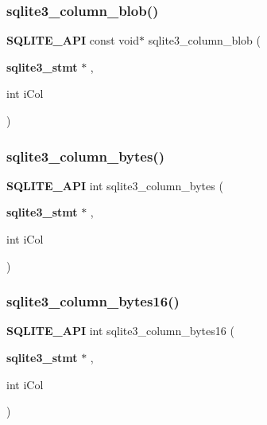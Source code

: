 \mbox{\label{sqlite3_8h_a4e4ed7d779580336885fbee879d4a823}} 
\subsubsection{sqlite3\_column\_blob()}
{\footnotesize\ttfamily \textbf{ S\+Q\+L\+I\+T\+E\+\_\+\+A\+PI} const void$\ast$ sqlite3\+\_\+column\+\_\+blob (\begin{DoxyParamCaption}\item[{\textbf{ sqlite3\+\_\+stmt} $\ast$}]{,  }\item[{int}]{i\+Col }\end{DoxyParamCaption})}

\mbox{\label{sqlite3_8h_a001421375b25195e3f80871dcb1be172}} 
\subsubsection{sqlite3\_column\_bytes()}
{\footnotesize\ttfamily \textbf{ S\+Q\+L\+I\+T\+E\+\_\+\+A\+PI} int sqlite3\+\_\+column\+\_\+bytes (\begin{DoxyParamCaption}\item[{\textbf{ sqlite3\+\_\+stmt} $\ast$}]{,  }\item[{int}]{i\+Col }\end{DoxyParamCaption})}

\mbox{\label{sqlite3_8h_ac861525fa4d70b48a46eabaa75130439}} 
\subsubsection{sqlite3\_column\_bytes16()}
{\footnotesize\ttfamily \textbf{ S\+Q\+L\+I\+T\+E\+\_\+\+A\+PI} int sqlite3\+\_\+column\+\_\+bytes16 (\begin{DoxyParamCaption}\item[{\textbf{ sqlite3\+\_\+stmt} $\ast$}]{,  }\item[{int}]{i\+Col }\end{DoxyParamCaption})}

\mbox{\label{sqlite3_8h_a326cbde878820fd108f5961d5318f585}} 

